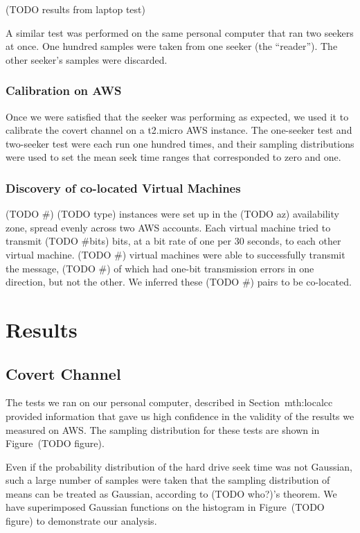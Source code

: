 \documentclass[conference]{IEEEtran}
\begin{document}
(TODO results from laptop test)

A similar test was performed on the same personal computer that ran two seekers at once.
One hundred samples were taken from one seeker (the ``reader'').
The other seeker's samples were discarded.

\subsubsection{Calibration on AWS}
Once we were satisfied that the seeker was performing as expected, we used it to calibrate the covert channel on a
  t2.micro AWS instance.
The one-seeker test and two-seeker test were each run one hundred times, and their sampling distributions were
  used to set the mean seek time ranges that corresponded to zero and one.

\subsubsection{Discovery of co-located Virtual Machines}
(TODO \#) (TODO type) instances were set up in the (TODO az) availability zone, spread evenly across two AWS accounts.
Each virtual machine tried to transmit (TODO \#bits) bits, at a bit rate of one per 30 seconds, to each other virtual
  machine.
(TODO \#) virtual machines were able to successfully transmit the message, (TODO \#) of which had one-bit transmission
  errors in one direction, but not the other.
We inferred these (TODO \#) pairs to be co-located.

\section{Results}
\subsection{Covert Channel}
The tests we ran on our personal computer, described in Section~{mth:localcc} provided information that gave us high
  confidence in the validity of the results we measured on AWS. The sampling distribution for these tests are shown in
  Figure~(TODO figure).

Even if the probability distribution of the hard drive seek time was not Gaussian, such a large number of samples were
  taken that the sampling distribution of means can be treated as Gaussian, according to (TODO who?)'s theorem.
We have superimposed Gaussian functions on the histogram in Figure~(TODO figure) to demonstrate our analysis.
\end{document}
